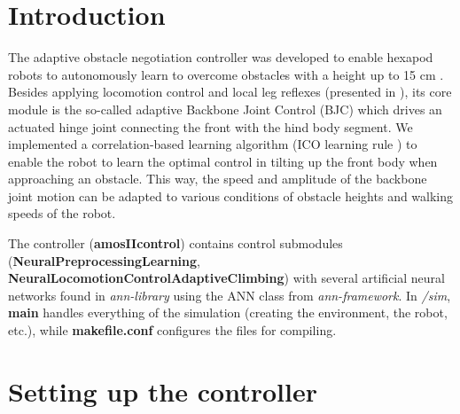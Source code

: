 \documentclass[a3, 14pt]{sciposter}
\begin{document}
\begin{multicols}{2}

\normalsize

\section{Introduction}

The adaptive obstacle negotiation controller was developed to enable hexapod robots to autonomously learn to overcome obstacles with a height up to 15 cm \cite{Goldschmidt2014}. Besides applying locomotion control and local leg reflexes (presented in \cite{Manoonpong2013}), its core module is the so-called adaptive Backbone Joint Control (BJC) which drives an actuated hinge joint connecting the front with the hind body segment. We implemented a correlation-based learning algorithm (ICO learning rule \cite{Porr2006}) to enable the robot to learn the optimal control in tilting up the front body when approaching an obstacle. This way, the speed and amplitude of the backbone joint motion can be adapted to various conditions of obstacle heights and walking speeds of the robot. 

The controller (\textbf{amosIIcontrol}) contains control submodules (\textbf{NeuralPreprocessingLearning}, \textbf{NeuralLocomotionControlAdaptiveClimbing}) with several artificial neural networks found in \textit{ann-library} using the ANN class from \textit{ann-framework}. In \textit{/sim}, \textbf{main} handles everything of the simulation (creating the environment, the robot, etc.), while \textbf{makefile.conf} configures the files for compiling.




\section{Setting up the controller}


\end{multicols}
\end{document}
